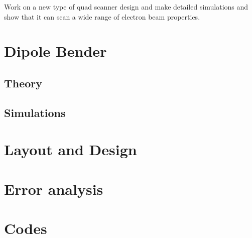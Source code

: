 \documentclass[11pt,a4paper]{article}
\begin{document}
    Work on a new type of quad scanner design and make detailed simulations and show that it can scan a wide range of electron beam properties. 
    
    
    
    
    
    
    \section{Dipole Bender}
    \subsection{Theory}
    \subsection{Simulations}
    
	\section{Layout and Design}
	\section{Error analysis} 
	\section{Codes}
	
	
	
	
	
\end{document}
